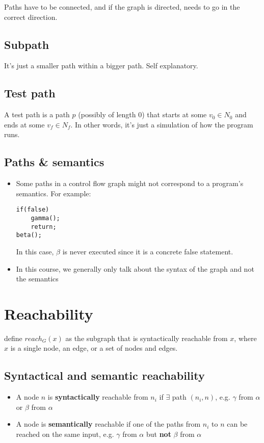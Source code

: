 \documentclass[12pt]{book}
\begin{document}
Paths have to be connected, and if the graph is directed, needs to go in the correct direction.

\subsection{Subpath}
It's just a smaller path within a bigger path. Self explanatory.

\subsection{Test path}

A test path is a path $p$ (possibly of length 0) that starts at some $v_0\in N_0$ and ends at some $v_f \in N_f$. In other words, it's just a simulation of how the program runs.

\subsection{Paths \& semantics}
\begin{itemize}
  \item Some paths in a control flow graph might not correspond to a program's semantics. For example:

  \begin{lstlisting}
if(false)
    gamma();
    return;
beta();
  \end{lstlisting}
  In this case, $\beta$ is never executed since it is a concrete false statement.

  \item In this course, we generally only talk about the syntax of the graph and not the semantics

\end{itemize}

\section{Reachability}
define $reach_G(x)$ as the subgraph that is syntactically reachable from $x$, where $x$ is a single node, an edge, or a set of nodes and edges.

\subsection{Syntactical and semantic reachability}

\begin{itemize}
  \item A node $n$ is \textbf{syntactically} reachable from $n_i$ if $\exists$ path $(n_i,n)$, e.g. $\gamma$ from $\alpha$ or $\beta$ from $\alpha$
  \item A node is \textbf{semantically} reachable if one of the paths from $n_i$ to $n$ can be reached on the same input, e.g. $\gamma$ from $\alpha$ but \textbf{not} $\beta$ from $\alpha$
\end{itemize}
\end{document}
